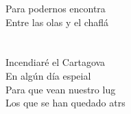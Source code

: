 \begin{cancion}
	Para podernos encontra\\
	Entre las olas y el chaflá \\
\jump\\
{}\vspace*{-0.4cm}\\
	Incendiaré el Cartagova\\
	En algún día espeial\\
	Para que vean nuestro lug\\
	Los que se han quedado atrs \\
\end{cancion}%
